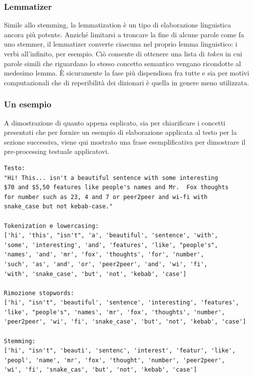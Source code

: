 \documentclass[hidelinks, 12pt]{article}
\begin{document}
\subsubsection{Lemmatizer}

Simile allo stemming, la lemmatization è un tipo di elaborazione linguistica ancora più potente. Anziché limitarsi a troncare la fine di alcune parole come fa uno stemmer, il lemmatizer converte ciascuna nel proprio lemma linguistico: i verbi all'infinito, per esempio. Ciò consente di ottenere una lista di \textit{token} in cui parole simili che riguardano lo stesso concetto semantico vengano ricondotte al medesimo lemma. È sicuramente la fase più dispendiosa fra tutte e sia per motivi computazionali che di reperibilità dei dizionari è quella in genere meno utilizzata.


\subsubsection{Un esempio}

A dimostrazione di quanto appena esplicato, sia per chiarificare i concetti presentati che per fornire un esempio di elaborazione applicata al testo per la sezione successiva, viene qui mostrato una frase esemplificativa per dimostrare il pre-processing testuale applicatovi.

\begin{verbatim}
Testo:
"Hi! This... isn't a beautiful sentence with some interesting 
$70 and $5,50 features like people's names and Mr.  Fox thoughts 
for number such as 23, 4 and 7 or peer2peer and wi-fi with 
snake_case but not kebab-case."

Tokenization e lowercasing:
['hi', 'this', "isn't", 'a', 'beautiful', 'sentence', 'with', 
'some', 'interesting', 'and', 'features', 'like', "people's", 
'names', 'and', 'mr', 'fox', 'thoughts', 'for', 'number', 
'such', 'as', 'and', 'or', 'peer2peer', 'and', 'wi', 'fi', 
'with', 'snake_case', 'but', 'not', 'kebab', 'case']

Rimozione stopwords:
['hi', "isn't", 'beautiful', 'sentence', 'interesting', 'features', 
'like', "people's", 'names', 'mr', 'fox', 'thoughts', 'number', 
'peer2peer', 'wi', 'fi', 'snake_case', 'but', 'not', 'kebab', 'case']

Stemming:
['hi', "isn't", 'beauti', 'sentenc', 'interest', 'featur', 'like', 
'peopl', 'name', 'mr', 'fox', 'thought', 'number', 'peer2peer', 
'wi', 'fi', 'snake_cas', 'but', 'not', 'kebab', 'case']
\end{verbatim}
\end{document}
